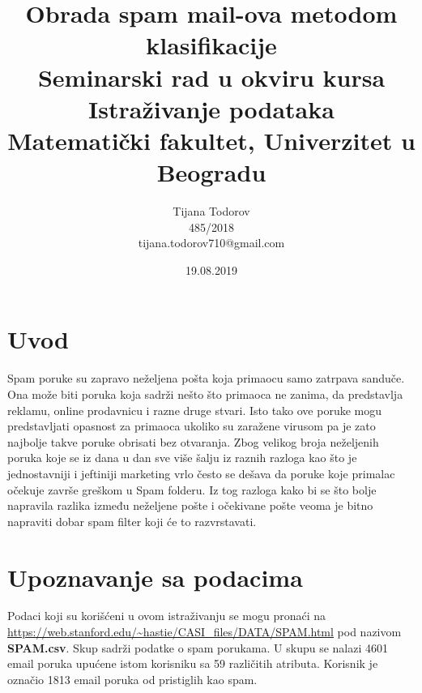 \documentclass[a4paper]{article}
\begin{document}
\title{Obrada spam mail-ova metodom klasifikacije\\ \small{Seminarski rad u okviru kursa\\Istraživanje podataka\\ Matematički fakultet, Univerzitet u Beogradu}}

\author{Tijana Todorov\\485/2018\\\small{tijana.todorov710@gmail.com}}

\date{19.08.2019}

\maketitle


\tableofcontents

\newpage


\section{Uvod}
\label{sec:Uvod}

Spam poruke su zapravo neželjena pošta koja primaocu samo zatrpava sanduče. Ona može biti poruka koja sadrži nešto što primaoca ne zanima, da predstavlja reklamu, online prodavnicu i razne druge stvari. Isto tako ove poruke mogu predstavljati opasnost za primaoca ukoliko su zaražene virusom pa je zato najbolje takve poruke obrisati bez otvaranja. Zbog velikog broja neželjenih poruka koje se iz dana u dan sve više šalju iz raznih razloga kao što je jednostavniji i jeftiniji marketing  vrlo često se dešava da poruke koje primalac očekuje završe greškom u Spam folderu. Iz tog razloga kako bi se što bolje napravila razlika između neželjene pošte i očekivane pošte veoma je bitno napraviti dobar spam filter koji će to razvrstavati. 

\section{Upoznavanje sa podacima}
\label{sec:Upoznavanje}

Podaci koji su korišćeni u ovom  istraživanju se mogu pronaći na \url{https://web.stanford.edu/~hastie/CASI_files/DATA/SPAM.html} pod nazivom \textbf{SPAM.csv}. Skup sadrži podatke o spam porukama. U skupu se nalazi 4601 email poruka upućene istom korisniku sa 59 različitih atributa. Korisnik je označio 1813 email poruka od pristiglih kao spam.
\end{document}
